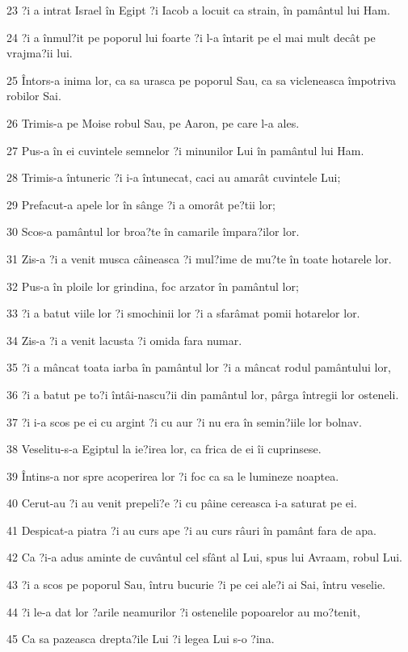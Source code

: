 \par 23 ?i a intrat Israel în Egipt ?i Iacob a locuit ca strain, în pamântul lui Ham.
\par 24 ?i a înmul?it pe poporul lui foarte ?i l-a întarit pe el mai mult decât pe vrajma?ii lui.
\par 25 Întors-a inima lor, ca sa urasca pe poporul Sau, ca sa vicleneasca împotriva robilor Sai.
\par 26 Trimis-a pe Moise robul Sau, pe Aaron, pe care l-a ales.
\par 27 Pus-a în ei cuvintele semnelor ?i minunilor Lui în pamântul lui Ham.
\par 28 Trimis-a întuneric ?i i-a întunecat, caci au amarât cuvintele Lui;
\par 29 Prefacut-a apele lor în sânge ?i a omorât pe?tii lor;
\par 30 Scos-a pamântul lor broa?te în camarile împara?ilor lor.
\par 31 Zis-a ?i a venit musca câineasca ?i mul?ime de mu?te în toate hotarele lor.
\par 32 Pus-a în ploile lor grindina, foc arzator în pamântul lor;
\par 33 ?i a batut viile lor ?i smochinii lor ?i a sfarâmat pomii hotarelor lor.
\par 34 Zis-a ?i a venit lacusta ?i omida fara numar.
\par 35 ?i a mâncat toata iarba în pamântul lor ?i a mâncat rodul pamântului lor,
\par 36 ?i a batut pe to?i întâi-nascu?ii din pamântul lor, pârga întregii lor osteneli.
\par 37 ?i i-a scos pe ei cu argint ?i cu aur ?i nu era în semin?iile lor bolnav.
\par 38 Veselitu-s-a Egiptul la ie?irea lor, ca frica de ei îi cuprinsese.
\par 39 Întins-a nor spre acoperirea lor ?i foc ca sa le lumineze noaptea.
\par 40 Cerut-au ?i au venit prepeli?e ?i cu pâine cereasca i-a saturat pe ei.
\par 41 Despicat-a piatra ?i au curs ape ?i au curs râuri în pamânt fara de apa.
\par 42 Ca ?i-a adus aminte de cuvântul cel sfânt al Lui, spus lui Avraam, robul Lui.
\par 43 ?i a scos pe poporul Sau, întru bucurie ?i pe cei ale?i ai Sai, întru veselie.
\par 44 ?i le-a dat lor ?arile neamurilor ?i ostenelile popoarelor au mo?tenit,
\par 45 Ca sa pazeasca drepta?ile Lui ?i legea Lui s-o ?ina.


